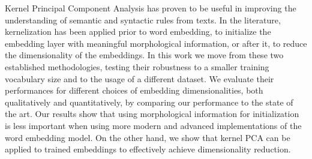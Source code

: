 Kernel Principal Component Analysis has proven to be useful in improving the understanding of semantic and syntactic rules from texts.
In the literature, kernelization has been applied prior to word embedding, to initialize the embedding layer with meaningful morphological information, or after it, to reduce the dimensionality of the embeddings. 
In this work we move from these two established methodologies, testing their robustness to a smaller training vocabulary size and to the usage of a different dataset.
We evaluate their performances for different choices of embedding dimensionalities, both qualitatively and quantitatively, by comparing our performance to the state of the art.
Our results show that using morphological information for initialization is less important when using more modern and advanced implementations of the word embedding model.
On the other hand, we show that kernel PCA can be applied to trained embeddings to effectively achieve dimensionality reduction.